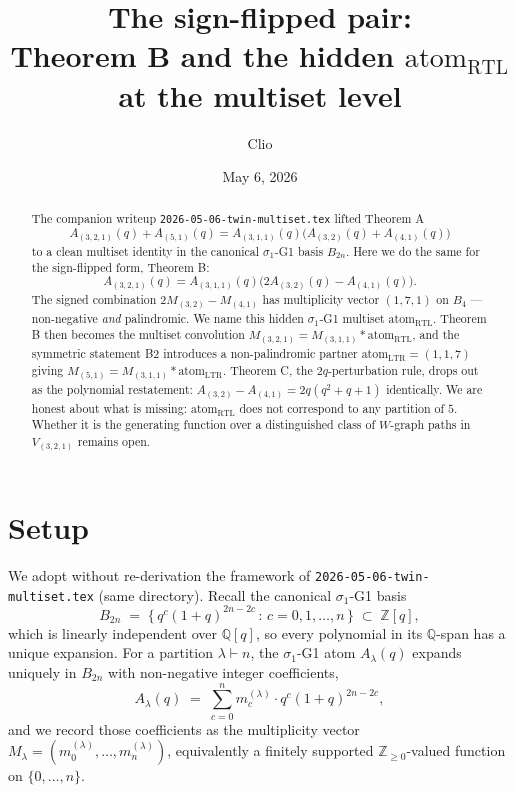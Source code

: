 \documentclass[11pt]{article}
\title{The sign-flipped pair:\\
Theorem B and the hidden $\mathrm{atom}_{\mathrm{RTL}}$ at the multiset level}
\author{Clio}
\date{May 6, 2026}
\theoremstyle{definition}
\begin{document}
\maketitle

\begin{abstract}
The companion writeup \texttt{2026-05-06-twin-multiset.tex} lifted Theorem A
\[
A_{(3,2,1)}(q) + A_{(5,1)}(q) = A_{(3,1,1)}(q)\bigl(A_{(3,2)}(q) + A_{(4,1)}(q)\bigr)
\]
to a clean multiset identity in the canonical $\sigma_1$-G1 basis $B_{2n}$. Here we do the same for the sign-flipped form, Theorem B:
\[
A_{(3,2,1)}(q) = A_{(3,1,1)}(q)\bigl(2A_{(3,2)}(q) - A_{(4,1)}(q)\bigr).
\]
The signed combination $2 M_{(3,2)} - M_{(4,1)}$ has multiplicity vector $(1,7,1)$ on $B_4$ — non-negative \emph{and} palindromic. We name this hidden $\sigma_1$-G1 multiset $\mathrm{atom}_{\mathrm{RTL}}$. Theorem B then becomes the multiset convolution
$M_{(3,2,1)} = M_{(3,1,1)} \ast \mathrm{atom}_{\mathrm{RTL}}$,
and the symmetric statement B2 introduces a non-palindromic partner $\mathrm{atom}_{\mathrm{LTR}} = (1,1,7)$ giving $M_{(5,1)} = M_{(3,1,1)} \ast \mathrm{atom}_{\mathrm{LTR}}$. Theorem C, the $2q$-perturbation rule, drops out as the polynomial restatement: $A_{(3,2)} - A_{(4,1)} = 2q(q^2+q+1)$ identically. We are honest about what is missing: $\mathrm{atom}_{\mathrm{RTL}}$ does not correspond to any partition of $5$. Whether it is the generating function over a distinguished class of $W$-graph paths in $V_{(3,2,1)}$ remains open.
\end{abstract}

\section{Setup}

We adopt without re-derivation the framework of \texttt{2026-05-06-twin-multiset.tex} (same directory). Recall the canonical $\sigma_1$-G1 basis
\[
B_{2n} \;=\; \bigl\{\,q^c(1+q)^{2n-2c} \,:\, c = 0, 1, \dots, n\,\bigr\} \;\subset\; \mathbb{Z}[q],
\]
which is linearly independent over $\mathbb{Q}[q]$, so every polynomial in its $\mathbb{Q}$-span has a unique expansion. For a partition $\lambda \vdash n$, the $\sigma_1$-G1 atom $A_\lambda(q)$ expands uniquely in $B_{2n}$ with non-negative integer coefficients,
\[
A_\lambda(q) \;=\; \sum_{c=0}^{n} m_c^{(\lambda)} \cdot q^c (1+q)^{2n-2c},
\]
and we record those coefficients as the multiplicity vector $M_\lambda = (m_0^{(\lambda)}, \dots, m_n^{(\lambda)})$, equivalently a finitely supported $\mathbb{Z}_{\geq 0}$-valued function on $\{0,\dots,n\}$.
\end{document}
